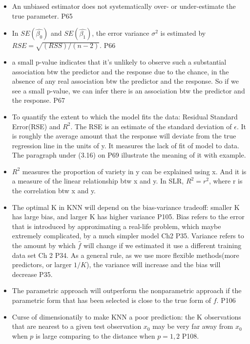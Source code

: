 \documentclass[a4paper, 12pt]{article}
\begin{document}
\begin{itemize}
	\item An unbiased estimator does not systematically over- or under-estimate the true parameter. P65
	\item In $SE(\hat{\beta_0})$ and $SE(\hat{\beta_1})$, the error variance $\sigma^2$ is estimated by $RSE=\sqrt{(RSS)/(n-2)}$. P66
	\item a small p-value indicates that it's unlikely to observe such a substantial association btw the predictor and the response due to the chance, in the absence of any real association btw the predictor and the response. So if we see a small p-value, we can infer there is an association btw the predictor and the response. P67
	\item To quantify the extent to which the model fits the data: Residual Standard Error(RSE) and $R^2$. The RSE is an estimate of the standard deviation of $\epsilon$. It is roughly the average amount that the response will deviate from the true regression line in the units of y. It measures the lack of fit of model to data. The paragraph under (3.16) on P69 illustrate the meaning of it with example. 
	\item $R^2$ measures the proportion of variety in y can be explained using x. And it is a measure of the linear relationship btw x and y. In SLR, $R^2=r^2$, where r is the correlation btw x and y.	
	\item The optimal K in KNN will depend on the bias-variance tradeoff: smaller K has large bias, and larger K has higher variance P105. Bias refers to the error that is introduced by approximating a real-life problem, which maybe extremely complicated, by a much simpler model Ch2 P35. Variance refers to the amount by which $\hat{f}$ will change if we estimated it use a different training data set Ch 2 P34. As a general rule, as we use more flexible methods(more predictors, or larger $1/K$), the variance will increase and the bias will decrease P35.
	
	\item  The parametric approach will outperform the nonparametric approach if the parametric form that has been selected is close to the true form of $f$. P106
	\item Curse of dimensionatily to make KNN a poor prediction: the K observations that are nearest to a given test observation $x_0$ may be very far away from $x_0$ when $p$ is large comparing to the distance when $p=1,2$ P108.
	
\end{itemize}
	
\end{document}
